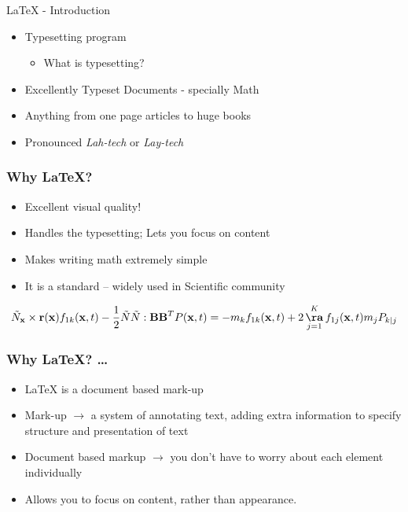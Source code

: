 \documentclass[12pt,compress]{beamer}
\begin{document}
\begin{frame}[fragile]
  \begin{block}{{\LaTeX} - Introduction}
    \begin{itemize}
      \item Typesetting program
       \begin{itemize}
         \item What is typesetting?
       \end{itemize}
      \item Excellently Typeset Documents - specially Math
      \item Anything from one page articles to huge books
      \item Pronounced \emph{Lah-tech} or \emph{Lay-tech}
    \end{itemize}
  \end{block}
\end{frame}

\begin{frame}[fragile]
  \frametitle{Why \LaTeX?}
  \begin{itemize}
  \item Excellent visual quality! 
  \item Handles the typesetting; Lets you focus on content
  \item Makes writing math extremely simple
  \item It is a standard -- widely used in Scientific community
  \end{itemize}
  \begin{block}{}
    \[\tilde{N}_{\mathbf{x}}\times \mathbf{r}(\mathbf{x}) f_{1k}(\mathbf{x},t) - \frac{1}{2} \tilde{N} \tilde{N}:\mathbf{BB}^{T}P(\mathbf{x},t) = -m_{k}f_{1k}(\mathbf{x},t) + 2 \mathop{\mathbf{\aa}}_{j=1}^{K} f_{1j}(\mathbf{x},t)m_{j}P_{k|j} \]
  \end{block}
\end{frame}

\begin{frame}[fragile]
  \frametitle{Why \LaTeX? \ldots}
  \begin{itemize}
  \item {\LaTeX} is a document based mark-up
  \item Mark-up $\rightarrow$ a system of annotating text, adding extra
    information to specify structure and presentation of text
  \item Document based markup $\rightarrow$ you don't have to worry
    about each element individually 
  \item Allows you to focus on content, rather than appearance.
  \end{itemize}
\end{frame}
\end{document}

